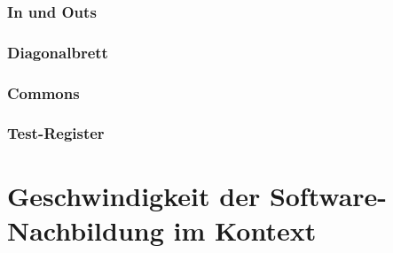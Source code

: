 \subsection{In und Outs}\label{subsec:impl_in_und_outs}
\subsection{Diagonalbrett}\label{subsec:impl_diagonal_board}
\subsection{Commons}\label{subsec:impl_commons}
\subsection{Test-Register}\label{subsec:impl_test-register}

\chapter{Geschwindigkeit der Software-Nachbildung im Kontext}